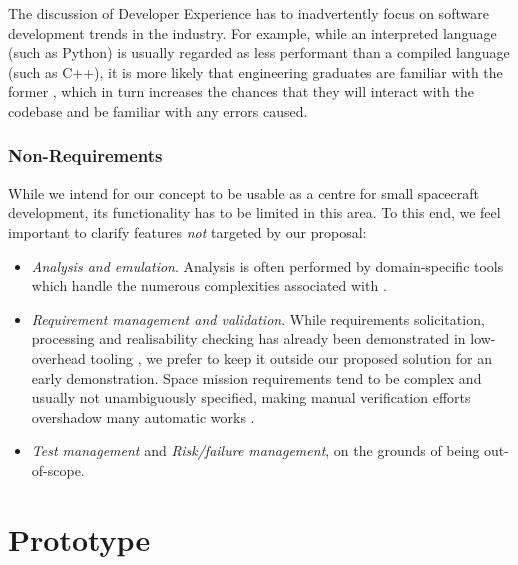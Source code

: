 \documentclass[]{iac}
\def\todo#1{}
\begin{document}
\begin{itemize}[itemsep=6pt]
    The discussion of Developer Experience has to inadvertently focus on software development trends in the industry. For example, while an interpreted language (such as Python) is usually regarded as less performant than a compiled language (such as C++), it is more likely that engineering graduates are familiar with the former \todo{citation}, which in turn increases the chances that they will interact with the codebase and be familiar with any errors caused.

    
\end{itemize}

\subsubsection{Non-Requirements}
While we intend for our concept to be usable as a centre for small spacecraft development, its functionality has to be limited in this area. To this end, we feel important to clarify features \emph{not} targeted by our proposal:
\begin{itemize}
    \item \emph{Analysis and emulation}. Analysis is often performed by domain-specific tools which handle the numerous complexities associated with \todo{simulations}. 
    \item \emph{Requirement management and validation}.
    While requirements solicitation, processing and realisability checking has already been demonstrated in low-overhead tooling \autocite{katis_capture_2022}, we prefer to keep it outside our proposed solution for an early demonstration. Space mission requirements tend to be complex and usually not unambiguously specified, making manual verification efforts overshadow many automatic works \todo{which are cool but beyond the scope of this paper}.

    \item \emph{Test management} and \emph{Risk/failure management}, on the grounds of being out-of-scope.
\end{itemize}






\section{Prototype}
\label{sec:prototype}
\end{document}
